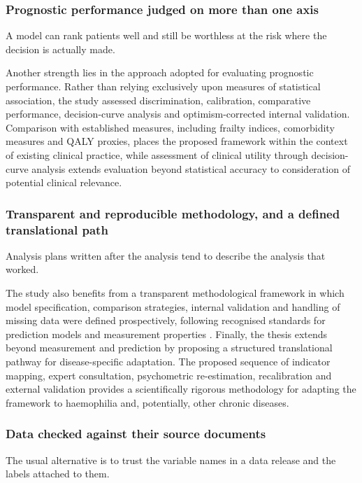 \subsubsection{Prognostic performance judged on more than one axis}

A model can rank patients well and still be worthless at the risk where the
decision is actually made.

Another strength lies in the approach adopted for evaluating prognostic performance. Rather than relying exclusively upon measures of statistical association, the study assessed discrimination, calibration, comparative performance, decision-curve analysis and optimism-corrected internal validation. Comparison with established measures, including frailty indices, comorbidity measures and QALY proxies, places the proposed framework within the context of existing clinical practice, while assessment of clinical utility through decision-curve analysis extends evaluation beyond statistical accuracy to consideration of potential clinical relevance.

\subsubsection{Transparent and reproducible methodology, and a defined translational path}

Analysis plans written after the analysis tend to describe the analysis that
worked.

The study also benefits from a transparent methodological framework in which model specification, comparison strategies, internal validation and handling of missing data were defined prospectively, following recognised standards for prediction models and measurement properties \citep{collins_2024,moons_2019}. Finally, the thesis extends beyond measurement and prediction by proposing a structured translational pathway for disease-specific adaptation. The proposed sequence of indicator mapping, expert consultation, psychometric re-estimation, recalibration and external validation provides a scientifically rigorous methodology for adapting the framework to haemophilia and, potentially, other chronic diseases.

\subsubsection{Data checked against their source documents}

The usual alternative is to trust the variable names in a data release and the
labels attached to them.

